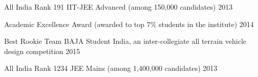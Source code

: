 
\begin{cvhonors}
	
%	
	\cvhonor
	{All India Rank 191 } %
	{IIT-JEE Advanced (among 150,000 candidates)} %
	{} %
	{2013} %
	
	\cvhonor
	{Academic Excellence Award} %
	{(awarded to top 7\% students in the institute) } %
	{} %
	{2014} %
	
	\cvhonor
	{Best Rookie Team} %
	{BAJA Student India, an inter-collegiate all terrain vehicle design competition} %
	{} %
	{2015} %
	
	\cvhonor
	{All India Rank 1234} %
	{JEE Mains (among 1,400,000 candidates)} %
	{} %
	{2013} %
	
%	
%	
\end{cvhonors}